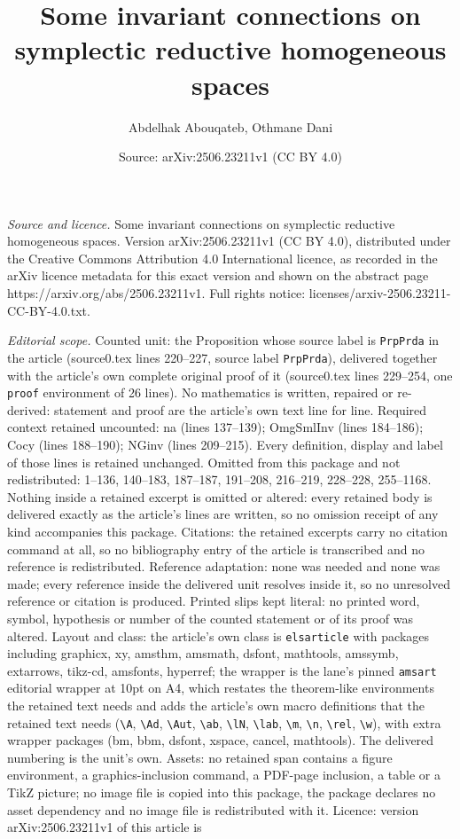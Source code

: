 \documentclass[10pt,a4paper]{amsart}
\title[Some invariant connections on symplectic reductive homogeneo]{Some invariant connections on symplectic reductive homogeneous spaces}
\author{Abdelhak Abouqateb, Othmane Dani}
\date{Source: arXiv:2506.23211v1 (CC BY 4.0)}
\begin{document}
\maketitle

\noindent\emph{Source and licence.} Some invariant connections on symplectic reductive homogeneous spaces. Version arXiv:2506.23211v1 (CC BY 4.0), distributed under the Creative Commons Attribution 4.0 International licence, as recorded in the arXiv licence metadata for this exact version and shown on the abstract page https://arxiv.org/abs/2506.23211v1. Full rights notice: licenses/arxiv-2506.23211-CC-BY-4.0.txt.\par\smallskip

\noindent\textit{Editorial scope.} Counted unit: the Proposition whose source label is \texttt{PrpPrda} in the article (source0.tex lines 220--227, source label \texttt{PrpPrda}), delivered together with the article's own complete original proof of it (source0.tex lines 229--254, one \texttt{proof} environment of 26 lines). No mathematics is written, repaired or re-derived: statement and proof are the article's own text line for line. Required context retained uncounted: na (lines 137--139); OmgSmlInv (lines 184--186); Cocy (lines 188--190); NGinv (lines 209--215). Every definition, display and label of those lines is retained unchanged. Omitted from this package and not redistributed: 1--136, 140--183, 187--187, 191--208, 216--219, 228--228, 255--1168. Nothing inside a retained excerpt is omitted or altered: every retained body is delivered exactly as the article's lines are written, so no omission receipt of any kind accompanies this package. Citations: the retained excerpts carry no citation command at all, so no bibliography entry of the article is transcribed and no reference is redistributed. Reference adaptation: none was needed and none was made; every reference inside the delivered unit resolves inside it, so no unresolved reference or citation is produced. Printed slips kept literal: no printed word, symbol, hypothesis or number of the counted statement or of its proof was altered. Layout and class: the article's own class is \texttt{elsarticle} with packages including graphicx, xy, amsthm, amsmath, dsfont, mathtools, amssymb, extarrows, tikz-cd, amsfonts, hyperref; the wrapper is the lane's pinned \texttt{amsart} editorial wrapper at 10pt on A4, which restates the theorem-like environments the retained text needs and adds the article's own macro definitions that the retained text needs (\texttt{\textbackslash A}, \texttt{\textbackslash Ad}, \texttt{\textbackslash Aut}, \texttt{\textbackslash ab}, \texttt{\textbackslash lN}, \texttt{\textbackslash lab}, \texttt{\textbackslash m}, \texttt{\textbackslash n}, \texttt{\textbackslash rel}, \texttt{\textbackslash w}), with extra wrapper packages (bm, bbm, dsfont, xspace, cancel, mathtools). The delivered numbering is the unit's own. Assets: no retained span contains a figure environment, a graphics-inclusion command, a PDF-page inclusion, a table or a TikZ picture; no image file is copied into this package, the package declares no asset dependency and no image file is redistributed with it. Licence: version arXiv:2506.23211v1 of this article is 
\end{document}
